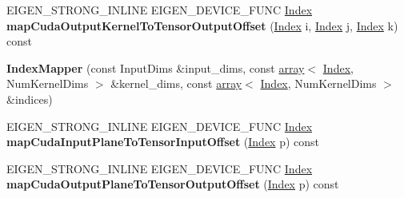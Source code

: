 \begin{DoxyCompactItemize}
\item 
\mbox{\label{class_eigen_1_1internal_1_1_index_mapper_a8121fd0cad53f4325760a1e11997e02d}} 
E\+I\+G\+E\+N\+\_\+\+S\+T\+R\+O\+N\+G\+\_\+\+I\+N\+L\+I\+NE E\+I\+G\+E\+N\+\_\+\+D\+E\+V\+I\+C\+E\+\_\+\+F\+U\+NC \hyperlink{namespace_eigen_a62e77e0933482dafde8fe197d9a2cfde}{Index} {\bfseries map\+Cuda\+Output\+Kernel\+To\+Tensor\+Output\+Offset} (\hyperlink{namespace_eigen_a62e77e0933482dafde8fe197d9a2cfde}{Index} i, \hyperlink{namespace_eigen_a62e77e0933482dafde8fe197d9a2cfde}{Index} j, \hyperlink{namespace_eigen_a62e77e0933482dafde8fe197d9a2cfde}{Index} k) const
\item 
\mbox{\label{class_eigen_1_1internal_1_1_index_mapper_a7d78e769adb4267d2f6e0e38a1fc2553}} 
{\bfseries Index\+Mapper} (const Input\+Dims \&input\+\_\+dims, const \hyperlink{class_eigen_1_1array}{array}$<$ \hyperlink{namespace_eigen_a62e77e0933482dafde8fe197d9a2cfde}{Index}, Num\+Kernel\+Dims $>$ \&kernel\+\_\+dims, const \hyperlink{class_eigen_1_1array}{array}$<$ \hyperlink{namespace_eigen_a62e77e0933482dafde8fe197d9a2cfde}{Index}, Num\+Kernel\+Dims $>$ \&indices)
\item 
\mbox{\label{class_eigen_1_1internal_1_1_index_mapper_a84f36b2d2263f07075c47d4e1f5a71b4}} 
E\+I\+G\+E\+N\+\_\+\+S\+T\+R\+O\+N\+G\+\_\+\+I\+N\+L\+I\+NE E\+I\+G\+E\+N\+\_\+\+D\+E\+V\+I\+C\+E\+\_\+\+F\+U\+NC \hyperlink{namespace_eigen_a62e77e0933482dafde8fe197d9a2cfde}{Index} {\bfseries map\+Cuda\+Input\+Plane\+To\+Tensor\+Input\+Offset} (\hyperlink{namespace_eigen_a62e77e0933482dafde8fe197d9a2cfde}{Index} p) const
\item 
\mbox{\label{class_eigen_1_1internal_1_1_index_mapper_a5bb5c53cbf626f5016214d34a6c01125}} 
E\+I\+G\+E\+N\+\_\+\+S\+T\+R\+O\+N\+G\+\_\+\+I\+N\+L\+I\+NE E\+I\+G\+E\+N\+\_\+\+D\+E\+V\+I\+C\+E\+\_\+\+F\+U\+NC \hyperlink{namespace_eigen_a62e77e0933482dafde8fe197d9a2cfde}{Index} {\bfseries map\+Cuda\+Output\+Plane\+To\+Tensor\+Output\+Offset} (\hyperlink{namespace_eigen_a62e77e0933482dafde8fe197d9a2cfde}{Index} p) const
\item 
\mbox{\label{class_eigen_1_1internal_1_1_index_mapper_a596c751ca92cbed2c1a760458629b6d1}} 

\end{DoxyCompactItemize}
